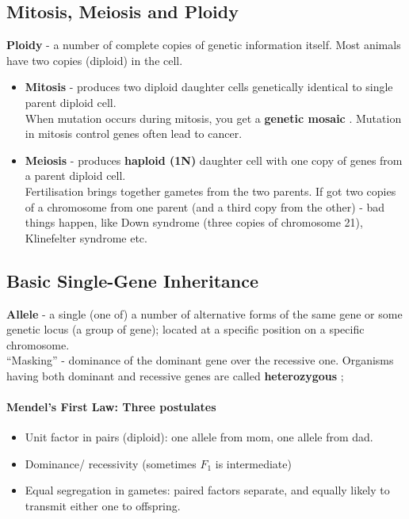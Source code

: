 \documentclass{scrartcl}
\begin{document}
\subsection{Mitosis, Meiosis and Ploidy}
\label{sec:2-4} {\bf Ploidy } - a number of complete copies of genetic information itself. Most animals have two copies (diploid) in the cell.
\begin{itemize}
\item {\bf Mitosis } - produces two diploid daughter cells genetically identical to single parent diploid cell.\\
  When mutation occurs during mitosis, you get a {\bf genetic mosaic }. Mutation in mitosis control genes often lead to cancer.
\item {\bf Meiosis} - produces {\bf haploid (1N)} daughter cell with one copy of genes from a parent diploid cell.\\
Fertilisation brings together gametes from the two parents. If got two copies of a chromosome from one parent (and a third copy from the other) - bad things happen, like Down syndrome (three copies of chromosome 21), Klinefelter syndrome etc.
\end{itemize}
\subsection{Basic Single-Gene Inheritance}
\label{sec:2-5} {\bf Allele } - a single (one of) a number of alternative forms
of the same gene or some genetic locus (a group of gene); located at a specific
position on a
specific chromosome.\\
``Masking'' - dominance of the dominant gene over the recessive one. Organisms
having both dominant and recessive genes are called {\bf heterozygous };

\paragraph{Mendel's First Law: Three postulates}
\begin{itemize}
\item Unit factor in pairs (diploid): one allele from mom, one allele from dad.
\item Dominance/ recessivity (sometimes $F_1$ is intermediate)
\item Equal segregation in gametes: paired factors separate, and equally likely
  to transmit either one to offspring.
\end{itemize}
\end{document}
